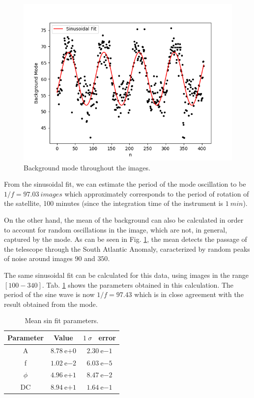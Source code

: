 \documentclass{aa}
\begin{document}
\begin{figure}[h]
\centering

\includegraphics[width=.4\textwidth]{background_mode.png}

\caption{Background mode throughout the images.}
\label{fig:mode}
\end{figure}

From the sinusoidal fit, we can estimate the period of the mode oscillation to be $1/f = 97.03\ images$ which approximately corresponds to the period of rotation of the satellite, 100 minutes (since the integration time of the instrument is $1\ min$).

On the other hand, the mean of the background can also be calculated in order to account for random oscillations in the image, which are not, in general, captured by the mode. As can be seen in Fig. \ref{tab:mean}, the mean detects the passage of the telescope through the South Atlantic Anomaly, caracterized by random peaks of noise around images $90$ and $350$.

The same sinusoidal fit can be calculated for this data, using images in the range $[100-340]$. Tab. \ref{tab:mean} shows the parameters obtained in this calculation. The period of the sine wave is now $1/f = 97.43$ which is in close agreement with the result obtained from the mode.

\begin{table}
\caption{Mean sin fit parameters.}
\label{tab:mean}
\centering
\begin{tabular}{c c c}
\hline
\noalign{\smallskip}
Parameter & Value & $1\ \sigma$ \ error \\
\hline
\noalign{\smallskip}
	A & $8.78\ \mathrm{e}{+0}$      & $2.30\ \mathrm{e}{-1}$ \\
	f & $1.02\ \mathrm{e}{-2}$      & $6.03\ \mathrm{e}{-5}$ \\
	$\phi$ & $4.96\ \mathrm{e}{+1}$ & $8.47\ \mathrm{e}{-2}$ \\
	DC & $8.94\ \mathrm{e}{+1}$     & $1.64\ \mathrm{e}{-1}$
\end{tabular}
\end{table}
\end{document}
